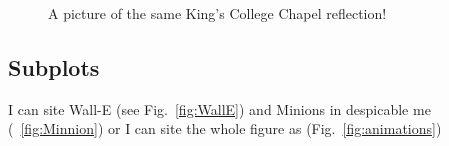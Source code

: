 \documentclass{report}
\begin{document}
\begin{figure}[h!]
  \centering
  \caption{A picture of the same King's College
  			Chapel reflection!}
\end{figure}

\clearpage
\begin{landscape}
\section*{Subplots}
I can site Wall-E (see Fig.~\ref{fig:WallE}) and Minions in despicable me (~\ref{fig:Minnion}) or I can site the whole figure as (Fig.~\ref{fig:animations})


\end{landscape}
\end{document}
